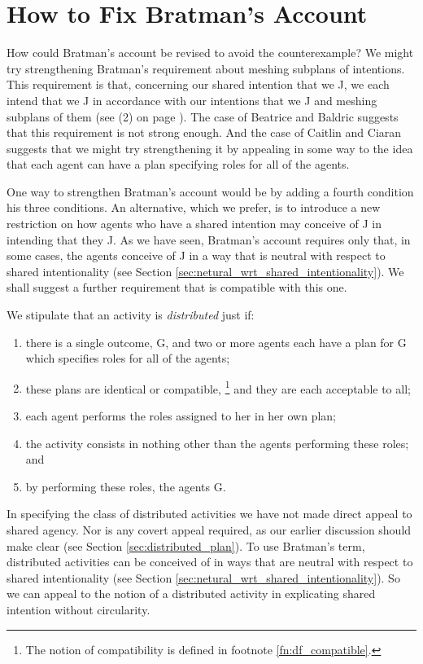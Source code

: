 \documentclass[12pt,\papersize]{extarticle}
\begin{document}
\section{How to Fix Bratman's Account}
\label{sec:fix}

How could Bratman's account be revised to avoid the counterexample?
We might try strengthening Bratman's requirement about meshing subplans of intentions.
This requirement is that, concerning our shared intention that we J, we each intend that we J in accordance with our intentions that we J and meshing subplans of them (see (2) on page \pageref{quote:bratman_account}).
The case of Beatrice and Baldric suggests that this requirement is not strong enough.
And the case of Caitlin and Ciaran suggests that we might try strengthening it by appealing in some way to the idea that each agent can have a plan specifying roles for all of the agents.

One way to strengthen Bratman's account would be by adding a fourth condition his three conditions.
An alternative, which we prefer, is to introduce a new restriction on how agents who have a shared intention may conceive of J in intending that they J.
As we have seen, Bratman's account requires only that, in some cases, the agents conceive of J in a way that is neutral with respect to shared intentionality (see Section \vref{sec:netural_wrt_shared_intentionality}).
We shall suggest a further requirement that is compatible with this one.

We stipulate that an activity is \emph{distributed} just if: 
\begin{enumerate}[label=\emph{\alph*})]
\item 	there is a single outcome, G,
	and two or more agents each have a plan for G which specifies  roles for all of the agents;	
\item 	these plans are identical or compatible,%
\footnote{
The notion of compatibility is defined in footnote \vref{fn:df_compatible}.
}
%
		and they are each acceptable to all; 
\item	each agent performs the roles assigned to her in her own plan;
\item	the activity consists in nothing other than the agents performing these roles;
	and
\item	by performing these roles, the agents G.

\end{enumerate}
%
In specifying the class of distributed activities we have not made direct appeal to shared agency. 
Nor is any covert appeal required, as our earlier discussion should  make clear (see Section \vref{sec:distributed_plan}).
To use Bratman's term, distributed activities can be conceived of in ways that are neutral with respect to shared intentionality (see Section \vref{sec:netural_wrt_shared_intentionality}).
So we can appeal  to the notion of a distributed activity in explicating shared intention without circularity.
\end{document}
